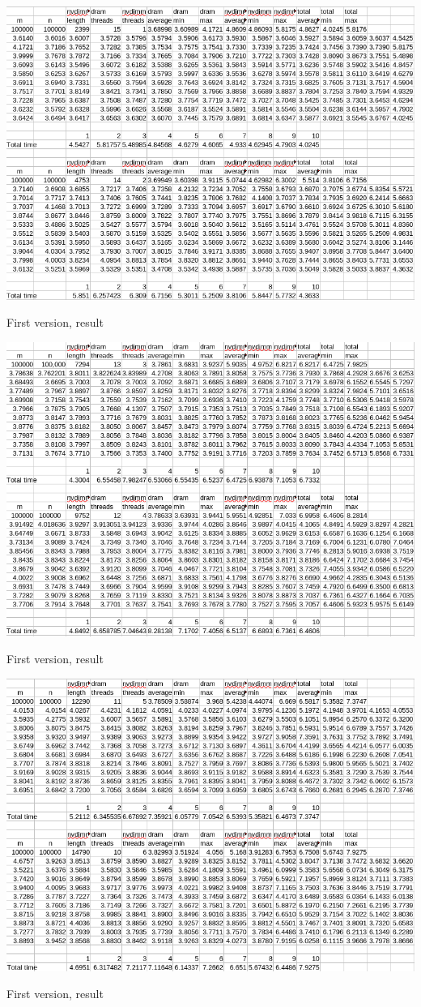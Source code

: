 \documentclass[12pt,a4paper,USenglish]{article}      %
\begin{document}
\begin{table}[!hbtp]
\includegraphics[scale=0.6]{Large_Array_test/First_version_100k_100k_Raw_1.png}
\caption{First version, result}
\end{table}
\begin{table}[!hbtp]
\includegraphics[scale=0.6]{Large_Array_test/First_version_100k_100k_Raw_2.png}
\caption{First version, result}
\end{table}
\begin{table}[!hbtp]
\includegraphics[scale=0.6]{Large_Array_test/First_version_100k_100k_Raw_3.png}
\caption{First version, result}
\end{table}
\end{document}
